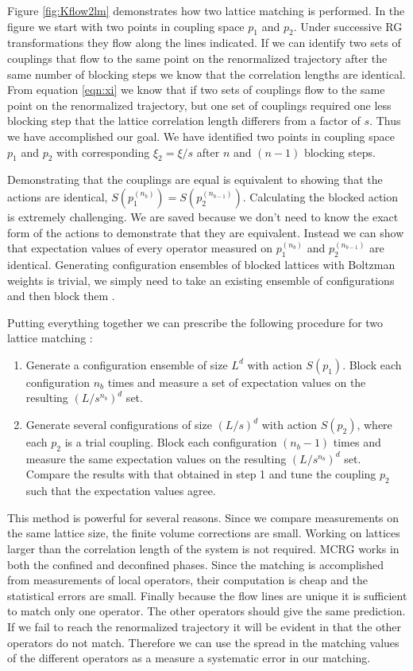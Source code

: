 Figure \ref{fig:Kflow2lm} demonstrates how two lattice matching is performed.
In the figure we start with two points in coupling space $p_1$ and $p_2$.
Under successive RG transformations they flow along the lines indicated.
If we can identify two sets of couplings that flow to the same point on the renormalized trajectory after the same number of blocking steps we know that the correlation lengths are identical.
From equation \ref{eqn:xi} we know that if two sets of couplings flow to the same point on the renormalized trajectory, but one set of couplings required one less blocking step that the lattice correlation length differers from a factor of $s$.
Thus we have accomplished our goal.
We have identified two points in coupling space $p_1$ and $p_2$ with corresponding $\xi_2=\xi/s$ after $n$ and $(n-1)$ blocking steps.

Demonstrating that the couplings are equal is equivalent to showing that the actions are identical, $S(p_1^{(n_b)})=S(p_2^{(n_{b-1})})$.
Calculating the blocked action is extremely challenging.
We are saved because we don't need to know the exact form of the actions to demonstrate that they are equivalent.
Instead we can show that expectation values of every operator measured on $p_1^{(n_b)}$ and $p_2^{(n_{b-1})}$ are identical.
Generating configuration ensembles of blocked lattices with Boltzman weights is trivial, we simply need to take an existing ensemble of configurations and then block them \cite{Swendsen:1979}.

Putting everything together we can prescribe the following procedure for two lattice matching \cite{Hasenfratz:2009}:
\begin{enumerate}
  \item Generate a configuration ensemble of size $L^d$ with action $S(p_1)$. Block each configuration $n_b$ times and measure a set of expectation values on the resulting $(L/s^{n_b})^d$ set.
  \item Generate several configurations of size $(L/s)^d$ with action $S(p_2)$, where each $p_2$ is a trial coupling. Block each configuration $(n_b-1)$ times and measure the same expectation values on the resulting $(L/s^{n_b})^d$ set. Compare the results with that obtained in step 1 and tune the coupling $p_2$ such that the expectation values agree. 
\end{enumerate}

This method is powerful for several reasons.
Since we compare measurements on the same lattice size, the finite volume corrections are small.
Working on lattices larger than the correlation length of the system is not required.
MCRG works in both the confined and deconfined phases.
Since the matching is accomplished from measurements of local operators, their computation is cheap and the statistical errors are small.
Finally because the flow lines are unique it is sufficient to match only one operator.
The other operators should give the same prediction.
If we fail to reach the renormalized trajectory it will be evident in that the other operators do not match.
Therefore we can use the spread in the matching values of the different operators as a measure a systematic error in our matching.

